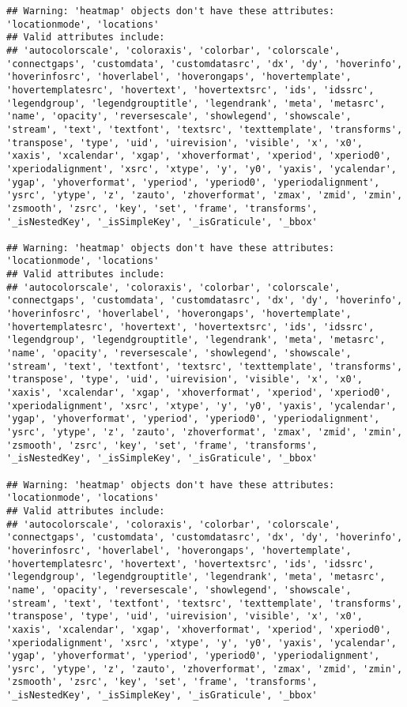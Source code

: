\documentclass[
]{article}
\begin{document}
\begin{verbatim}
## Warning: 'heatmap' objects don't have these attributes: 'locationmode', 'locations'
## Valid attributes include:
## 'autocolorscale', 'coloraxis', 'colorbar', 'colorscale', 'connectgaps', 'customdata', 'customdatasrc', 'dx', 'dy', 'hoverinfo', 'hoverinfosrc', 'hoverlabel', 'hoverongaps', 'hovertemplate', 'hovertemplatesrc', 'hovertext', 'hovertextsrc', 'ids', 'idssrc', 'legendgroup', 'legendgrouptitle', 'legendrank', 'meta', 'metasrc', 'name', 'opacity', 'reversescale', 'showlegend', 'showscale', 'stream', 'text', 'textfont', 'textsrc', 'texttemplate', 'transforms', 'transpose', 'type', 'uid', 'uirevision', 'visible', 'x', 'x0', 'xaxis', 'xcalendar', 'xgap', 'xhoverformat', 'xperiod', 'xperiod0', 'xperiodalignment', 'xsrc', 'xtype', 'y', 'y0', 'yaxis', 'ycalendar', 'ygap', 'yhoverformat', 'yperiod', 'yperiod0', 'yperiodalignment', 'ysrc', 'ytype', 'z', 'zauto', 'zhoverformat', 'zmax', 'zmid', 'zmin', 'zsmooth', 'zsrc', 'key', 'set', 'frame', 'transforms', '_isNestedKey', '_isSimpleKey', '_isGraticule', '_bbox'

## Warning: 'heatmap' objects don't have these attributes: 'locationmode', 'locations'
## Valid attributes include:
## 'autocolorscale', 'coloraxis', 'colorbar', 'colorscale', 'connectgaps', 'customdata', 'customdatasrc', 'dx', 'dy', 'hoverinfo', 'hoverinfosrc', 'hoverlabel', 'hoverongaps', 'hovertemplate', 'hovertemplatesrc', 'hovertext', 'hovertextsrc', 'ids', 'idssrc', 'legendgroup', 'legendgrouptitle', 'legendrank', 'meta', 'metasrc', 'name', 'opacity', 'reversescale', 'showlegend', 'showscale', 'stream', 'text', 'textfont', 'textsrc', 'texttemplate', 'transforms', 'transpose', 'type', 'uid', 'uirevision', 'visible', 'x', 'x0', 'xaxis', 'xcalendar', 'xgap', 'xhoverformat', 'xperiod', 'xperiod0', 'xperiodalignment', 'xsrc', 'xtype', 'y', 'y0', 'yaxis', 'ycalendar', 'ygap', 'yhoverformat', 'yperiod', 'yperiod0', 'yperiodalignment', 'ysrc', 'ytype', 'z', 'zauto', 'zhoverformat', 'zmax', 'zmid', 'zmin', 'zsmooth', 'zsrc', 'key', 'set', 'frame', 'transforms', '_isNestedKey', '_isSimpleKey', '_isGraticule', '_bbox'

## Warning: 'heatmap' objects don't have these attributes: 'locationmode', 'locations'
## Valid attributes include:
## 'autocolorscale', 'coloraxis', 'colorbar', 'colorscale', 'connectgaps', 'customdata', 'customdatasrc', 'dx', 'dy', 'hoverinfo', 'hoverinfosrc', 'hoverlabel', 'hoverongaps', 'hovertemplate', 'hovertemplatesrc', 'hovertext', 'hovertextsrc', 'ids', 'idssrc', 'legendgroup', 'legendgrouptitle', 'legendrank', 'meta', 'metasrc', 'name', 'opacity', 'reversescale', 'showlegend', 'showscale', 'stream', 'text', 'textfont', 'textsrc', 'texttemplate', 'transforms', 'transpose', 'type', 'uid', 'uirevision', 'visible', 'x', 'x0', 'xaxis', 'xcalendar', 'xgap', 'xhoverformat', 'xperiod', 'xperiod0', 'xperiodalignment', 'xsrc', 'xtype', 'y', 'y0', 'yaxis', 'ycalendar', 'ygap', 'yhoverformat', 'yperiod', 'yperiod0', 'yperiodalignment', 'ysrc', 'ytype', 'z', 'zauto', 'zhoverformat', 'zmax', 'zmid', 'zmin', 'zsmooth', 'zsrc', 'key', 'set', 'frame', 'transforms', '_isNestedKey', '_isSimpleKey', '_isGraticule', '_bbox'
\end{verbatim}
\end{document}
